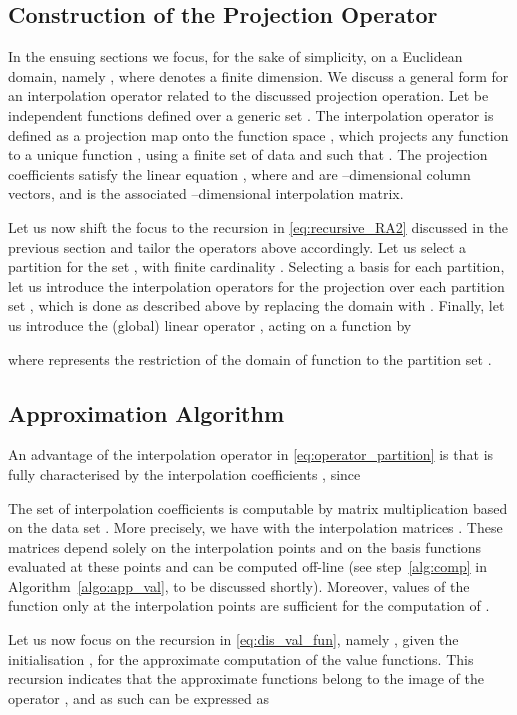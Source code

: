 \documentclass{LMCS}
\begin{document}
\subsection{Construction of the Projection Operator}

In the ensuing sections we focus, for the sake of simplicity, on a Euclidean domain,   
namely , 
where  denotes a finite dimension.
We discuss a general form for an interpolation operator related to the discussed projection operation. 
Let  be independent functions 
defined over a generic set . 
The interpolation operator  is defined
as a projection map onto the function space , 
which projects any function 
to a unique function ,
using a finite set of data  and 
such that .  
The projection coefficients  satisfy the linear equation ,
where  and  are --dimensional column vectors, 
and  is the associated --dimensional interpolation matrix.

\medskip

Let us now shift the focus to the recursion in \eqref{eq:recursive_RA2} discussed in the previous section and tailor the operators above accordingly. 
Let us select a partition  for the set , 
with finite cardinality . 
Selecting a basis  for each partition, 
let us introduce the interpolation operators  
for the projection over each partition set ,  
which is done as described above by replacing the domain  with . 
Finally, let us introduce the (global) linear operator , 
acting on a function  by 

where  represents the restriction of the domain of function  to the partition set .

\subsection{Approximation Algorithm}
An advantage of the interpolation operator in \eqref{eq:operator_partition} is that  
is fully characterised by the interpolation coefficients , since 
 
The set of interpolation coefficients  is computable by matrix multiplication 
based on the data set .
More precisely, we have  with the interpolation matrices .
These matrices depend solely on the interpolation points  and on the basis functions  evaluated at these points 
and can be computed off-line (see step~\ref{alg:comp} in Algorithm~\ref{algo:app_val}, to be discussed shortly).
Moreover, values of the function  only at the interpolation points  are sufficient for the computation of . 

Let us now focus on the recursion in \eqref{eq:dis_val_fun}, 
namely , 
given the initialisation , 
for the approximate computation of the value functions. 
This recursion indicates that the approximate functions  belong to the image of the operator , 
and as such can be expressed as 
\end{document}
